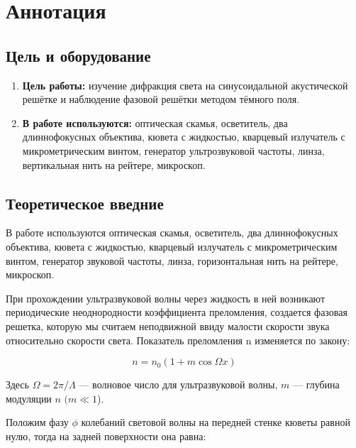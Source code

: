 


	
	
	
	\section*{Аннотация}
	
	\subsection*{Цель и оборудование}
	
	\begin{enumerate}
		\item \textbf{Цель работы:} изучение дифракция света на синусоидальной акустической решётке и наблюдение фазовой решётки методом тёмного поля.
		
		\item \textbf{В работе используются:} оптическая скамья, осветитель, два длиннофокусных объектива, кювета с жидкостью, кварцевый излучатель с микрометрическим винтом, генератор ультрозвуковой частоты, линза, вертикальная нить на рейтере, микроскоп.		
	\end{enumerate}    
	
	\subsection*{Теоретическое введние}	
	
	В работе используются оптическая скамья, осветитель, два длиннофокусных объектива, кювета с жидкостью, кварцевый излучатель с микрометрическим винтом, генератор звуковой частоты, линза, горизонтальная нить на рейтере, микроскоп. 
	
	При прохождении ультразвуковой волны через жидкость в ней возникают периодические неоднородности коэффициента преломления, создается фазовая решетка, которую мы считаем неподвижной ввиду малости скорости звука относительно скорости света. Показатель
	преломления n изменяется по закону:
	
	\begin{equation}\label{}
	n = n_0 (1 + m \cos \Omega x)
	\end{equation}
	
	Здесь $ \Omega = 2 \pi / \Lambda $ --- волновое число для ультразвуковой волны, $ m $ --- глубина модуляции $ n $ $ (m \ll 1 $).
	
	Положим фазу $ \phi $ колебаний световой волны на передней стенке кюветы равной нулю, тогда на задней поверхности она равна:
	

